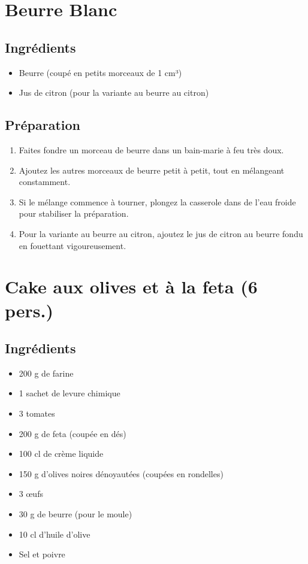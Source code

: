 \section{Beurre Blanc}\label{beurre-blanc}

\subsection{Ingrédients}\label{ingruxe9dients}

\begin{itemize}

\item
  Beurre (coupé en petits morceaux de 1 cm³)
\item
  Jus de citron (pour la variante au beurre au citron)
\end{itemize}

\subsection{Préparation}\label{pruxe9paration}

\begin{enumerate}
\def\labelenumi{\arabic{enumi}.}

\item
  Faites fondre un morceau de beurre dans un bain-marie à feu très doux.
\item
  Ajoutez les autres morceaux de beurre petit à petit, tout en
  mélangeant constamment.
\item
  Si le mélange commence à tourner, plongez la casserole dans de l'eau
  froide pour stabiliser la préparation.
\item
  Pour la variante au beurre au citron, ajoutez le jus de citron au
  beurre fondu en fouettant vigoureusement.
\end{enumerate}

\section{Cake aux olives et à la feta (6
pers.)}\label{cake-aux-olives-et-uxe0-la-feta-6-pers.}

\subsection{Ingrédients}\label{ingruxe9dients-1}

\begin{itemize}

\item
  200 g de farine
\item
  1 sachet de levure chimique
\item
  3 tomates
\item
  200 g de feta (coupée en dés)
\item
  100 cl de crème liquide
\item
  150 g d'olives noires dénoyautées (coupées en rondelles)
\item
  3 œufs
\item
  30 g de beurre (pour le moule)
\item
  10 cl d'huile d'olive
\item
  Sel et poivre
\end{itemize}

